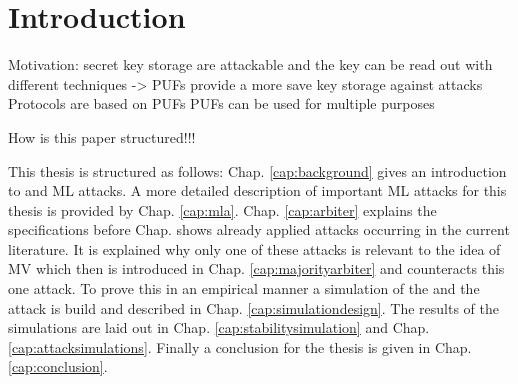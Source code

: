 \chapter{Introduction}




Motivation: secret key storage are attackable and the key can be read out with different techniques
-> PUFs provide a more save key storage against attacks
Protocols are based on PUFs
PUFs can be used for multiple purposes

How is this paper structured!!!

This thesis is structured as follows: 
Chap. \ref{cap:background} gives an introduction to \pufs and \ac{ML} attacks.
A more detailed description of important \ac{ML} attacks for this thesis is provided by Chap. \ref{cap:mla}.
Chap. \ref{cap:arbiter} explains the \apuf specifications before Chap. shows already applied attacks occurring in the current literature.
It is explained why only one of these attacks is relevant to the idea of \ac{MV} which then is introduced in Chap. \ref{cap:majorityarbiter} and counteracts this one attack.
To prove this in an empirical manner a simulation of the \apuf and the attack is build and described in Chap. \ref{cap:simulationdesign}.
The results of the simulations are laid out in Chap. \ref{cap:stabilitysimulation} and Chap. \ref{cap:attacksimulations}.
Finally a conclusion for the thesis is given in Chap. \ref{cap:conclusion}.

